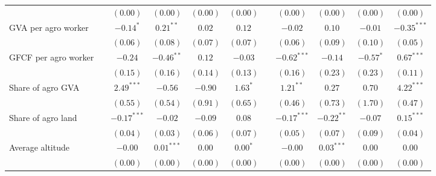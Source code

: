 \begin{table}
\begin{center}
\begin{tabular}{l c c c c c c c c c c}
                                  &               & $(0.00)$      & $(0.00)$      & $(0.00)$      & $(0.00)$       &               & $(0.00)$      & $(0.00)$      & $(0.00)$      & $(0.00)$       \\
GVA per agro worker               &               & $-0.14^{*}$   & $0.21^{**}$   & $0.02$        & $0.12$         &               & $-0.02$       & $0.10$        & $-0.01$       & $-0.35^{***}$  \\
                                  &               & $(0.06)$      & $(0.08)$      & $(0.07)$      & $(0.07)$       &               & $(0.06)$      & $(0.09)$      & $(0.10)$      & $(0.05)$       \\
GFCF per agro worker              &               & $-0.24$       & $-0.46^{**}$  & $0.12$        & $-0.03$        &               & $-0.62^{***}$ & $-0.14$       & $-0.57^{*}$   & $0.67^{***}$   \\
                                  &               & $(0.15)$      & $(0.16)$      & $(0.14)$      & $(0.13)$       &               & $(0.16)$      & $(0.23)$      & $(0.23)$      & $(0.11)$       \\
Share of agro GVA                 &               & $2.49^{***}$  & $-0.56$       & $-0.90$       & $1.63^{*}$     &               & $1.21^{**}$   & $0.27$        & $0.70$        & $4.22^{***}$   \\
                                  &               & $(0.55)$      & $(0.54)$      & $(0.91)$      & $(0.65)$       &               & $(0.46)$      & $(0.73)$      & $(1.70)$      & $(0.47)$       \\
Share of agro land                &               & $-0.17^{***}$ & $-0.02$       & $-0.09$       & $0.08$         &               & $-0.17^{***}$ & $-0.22^{**}$  & $-0.07$       & $0.15^{***}$   \\
                                  &               & $(0.04)$      & $(0.03)$      & $(0.06)$      & $(0.07)$       &               & $(0.05)$      & $(0.07)$      & $(0.09)$      & $(0.04)$       \\
Average altitude                  &               & $-0.00$       & $0.01^{***}$  & $0.00$        & $0.00^{*}$     &               & $-0.00$       & $0.03^{***}$  & $0.00$        & $0.00$         \\
                                  &               & $(0.00)$      & $(0.00)$      & $(0.00)$      & $(0.00)$       &               & $(0.00)$      & $(0.00)$      & $(0.00)$      & $(0.00)$       \\

\end{tabular}
\end{center}
\end{table}
